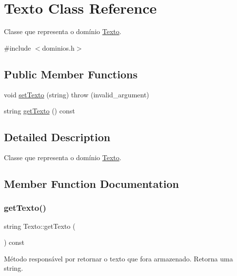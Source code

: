 \hypertarget{classTexto}{}\section{Texto Class Reference}
\label{classTexto}


Classe que representa o domínio \hyperlink{classTexto}{Texto}.  




{\ttfamily \#include $<$dominios.\+h$>$}

\subsection*{Public Member Functions}
\begin{DoxyCompactItemize}
\item 
void \hyperlink{classTexto_a2757e0409bd76bb77c8eb6ecb09cc69d}{set\+Texto} (string)  throw (invalid\+\_\+argument)
\item 
string \hyperlink{classTexto_a69463b543f36eaf86076ef48c896987f}{get\+Texto} () const
\end{DoxyCompactItemize}


\subsection{Detailed Description}
Classe que representa o domínio \hyperlink{classTexto}{Texto}. 

\subsection{Member Function Documentation}
\mbox{\label{classTexto_a69463b543f36eaf86076ef48c896987f}} 
\subsubsection{\texorpdfstring{get\+Texto()}{getTexto()}}
{\footnotesize\ttfamily string Texto\+::get\+Texto (\begin{DoxyParamCaption}{ }\end{DoxyParamCaption}) const\hspace{0.3cm}{\ttfamily [inline]}}

Método responsável por retornar o texto que fora armazenado. Retorna uma string. \mbox{\label{classTexto_a2757e0409bd76bb77c8eb6ecb09cc69d}} 
